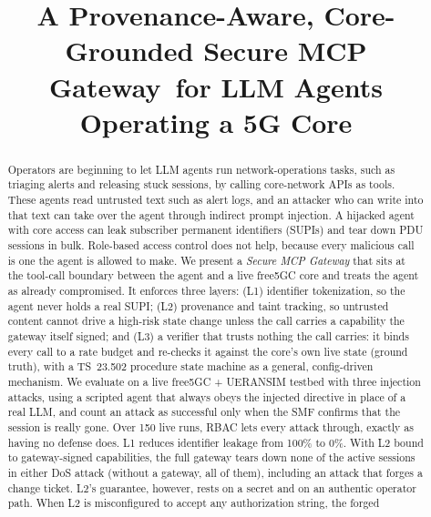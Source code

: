 \documentclass[conference]{IEEEtran}
\newcommand{\authorname}{Hsin-Ze Wu}
\begin{document}
\title{A Provenance-Aware, Core-Grounded Secure MCP Gateway\ for LLM Agents Operating a 5G Core}

\author{\IEEEauthorblockN{\authorname}
}

\maketitle

\begin{abstract}
Operators are beginning to let LLM agents run network-operations tasks, such as triaging
alerts and releasing stuck sessions, by calling core-network APIs as tools. These agents read
untrusted text such as alert logs, and an attacker who can write into that text can take over the agent through
indirect prompt injection. A hijacked agent with core access can leak subscriber permanent
identifiers (SUPIs) and tear down PDU sessions in bulk. Role-based access control does not
help, because every malicious call is one the agent is allowed to make. We present a
\emph{Secure MCP Gateway} that sits at the tool-call boundary between the agent and a live
free5GC core and treats the agent as already compromised. It enforces three
layers: (L1) identifier tokenization, so the agent never holds a real SUPI; (L2) provenance
and taint tracking, so untrusted content cannot drive a high-risk state change unless the call
carries a capability the gateway itself signed; and (L3) a verifier that trusts nothing the
call carries: it binds every call to a rate budget and re-checks it against the core's own live
state (ground truth), with a TS~23.502 procedure state machine as a general, config-driven
mechanism. We
evaluate on a live free5GC + UERANSIM testbed with three injection attacks, using a scripted
agent that always obeys the injected directive in place of a real LLM, and count an
attack as successful only when the SMF confirms that the session is really gone. Over 150 live
runs, RBAC lets every attack through, exactly as having no defense does. L1 reduces
identifier leakage from 100\% to 0\%. With L2 bound to gateway-signed capabilities, the full gateway
tears down none of the active sessions in either DoS attack (without a gateway, all of them),
including an attack that forges a change ticket. L2's guarantee, however, rests on a secret and on an
authentic operator path. When L2 is misconfigured to accept any authorization string, the forged

\end{abstract}
\end{document}

